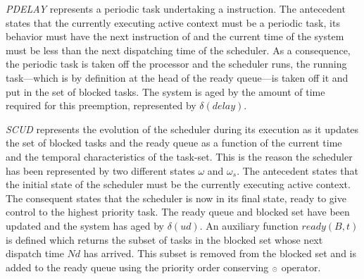 \emph{PDELAY} represents a periodic task undertaking a  instruction. The antecedent states that the currently
executing active context must be a periodic task, its behavior must
have the next instruction of  and the current time of
the system must be less than the next dispatching time of the
scheduler. As a consequence, the periodic task is taken off the
processor and the scheduler runs, the running task---which is by
definition at the head of the ready queue---is taken off it and put in
the set of blocked tasks. The system is aged by the amount of time
required for this preemption, represented by $\delta(delay)$.


\emph{SCUD} represents the evolution of the scheduler during its
execution as it updates the set of blocked tasks and the ready queue
as a function of the current time and the temporal characteristics of
the task-set. This is the reason the scheduler has been represented by
two different states $\omega$ and $\omega_s$. The antecedent states
that the initial state of the scheduler must be the currently
executing active context. The consequent states that the scheduler is
now in its final state, ready to give control to the highest priority
task. The ready queue and blocked set have been updated and the system
has aged by $\delta(ud)$. An auxiliary function $ready(B,t)$ is
defined which returns the subset of tasks in the blocked set whose
next dispatch time $Nd$ has arrived. This subset is removed from the
blocked set and is added to the ready queue using the priority
order conserving ${\scriptscriptstyle \odot}$ operator.

